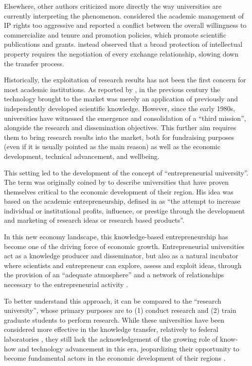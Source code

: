 Elsewhere, other authors criticized more directly the way universities are currently interpreting the phenomenon. \citet{Siegel2003a} considered the academic management of IP rights too aggressive and reported a conflict between the overall willingness to commercialize and tenure and promotion policies, which promote scientific publications and grants. \citet{Murray2005} instead observed that a broad protection of intellectual property requires the negotiation of every exchange relationship, slowing down the transfer process.

Historically, the exploitation of research results has not been the first concern for most academic institutions. As reported by \citet{Balconi2006}, in the previous century the technology brought to the market was merely an application of previously and independently developed scientific knowledge. However, since the early 1980s, universities have witnessed the emergence and consolidation of a \enquote{third mission}, alongside the research and dissemination objectives. This further aim requires them to bring research results into the market, both for fundraising purposes (even if it is usually pointed as the main reason) as well as the economic development, technical advancement, and wellbeing. 

This setting led to the development of the concept of \enquote{entrepreneurial university}. The term was originally coined by \citet{Etzkowitz1998} to describe universities that have proven themselves critical to the economic development of their region. His idea was based on the academic entrepreneurship, defined in \citet{Louis1989} as \enquote{the attempt to increase individual or institutional profits, influence, or prestige through the development and marketing of research ideas or research based products}.

In this new economy landscape, this knowledge-based entrepreneurship has become one of the driving force of economic growth. Entrepreneurial universities act as a knowledge producer and disseminator, but also as a natural incubator where scientists and entrepreneur can explore, assess and exploit ideas, through the provision of an \enquote{adequate atmosphere} and a network of relationships necessary to the entrepreneurial activity \citep{Guerrero2014}.

To better understand this approach, it can be compared to the \enquote{research university}, whose primary purposes are to (1) conduct research and (2) train graduate students to perform research. While these universities have been considered more effective in the knowledge transfer, relatively to federal laboratories \citep{Rogers2001}, they still lack the acknowledgement of the growing role of know-how and technology advancement in this era, jeopardizing their opportunity to become fundamental actors in the economic development of their regions \citep{OShea2004}.

